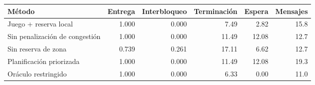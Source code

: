 \begin{tabular}{lrrrrr}
\toprule
Método & Entrega & Interbloqueo & Terminación & Espera & Mensajes \\
\midrule
Juego + reserva local & 1.000 & 0.000 & 7.49 & 2.82 & 15.8 \\
Sin penalización de congestión & 1.000 & 0.000 & 11.49 & 12.08 & 12.7 \\
Sin reserva de zona & 0.739 & 0.261 & 17.11 & 6.62 & 12.7 \\
Planificación priorizada & 1.000 & 0.000 & 11.49 & 12.08 & 19.3 \\
Oráculo restringido & 1.000 & 0.000 & 6.33 & 0.00 & 11.0 \\
\bottomrule
\end{tabular}
